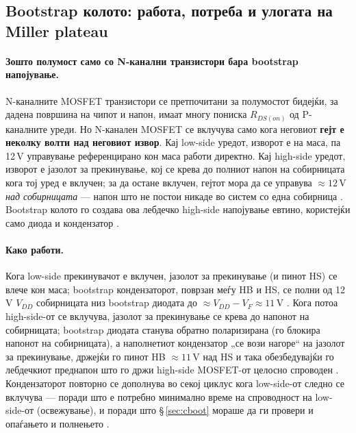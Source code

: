 \documentclass[11pt,a4paper]{article}
\newcommand{\eng}[1]{\textenglish{#1}}
\begin{document}
\subsection{Bootstrap колото: работа, потреба и улогата на Miller plateau}
\label{sec:boottheory}

\paragraph{Зошто полумост само со N-канални транзистори бара bootstrap напојување.} N-каналните MOSFET транзистори се претпочитани за полумостот бидејќи, за дадена површина на чипот и напон, имаат многу пониска $R_{DS(on)}$ од P-каналните уреди. Но N-канален MOSFET се вклучува само кога неговиот \textbf{гејт е неколку волти над неговиот извор}. Кај \eng{low-side} уредот, изворот е на маса, па 12\,V управување референцирано кон маса работи директно. Кај \eng{high-side} уредот, изворот е јазолот за прекинување, кој се крева до полниот напон на собирницата кога тој уред е вклучен; за да остане вклучен, гејтот мора да се управува $\approx 12$\,V \emph{над собирницата} --- напон што не постои никаде во систем со една собирница \cite{ref3,ref5}. \eng{Bootstrap} колото го создава ова лебдечко \eng{high-side} напојување евтино, користејќи само диода и кондензатор \cite{ref6}.

\paragraph{Како работи.} Кога \eng{low-side} прекинувачот е вклучен, јазолот за прекинување (и пинот HS) се влече кон маса; \eng{bootstrap} кондензаторот, поврзан меѓу HB и HS, се полни од 12\,V $V_{DD}$ собирницата низ \eng{bootstrap} диодата до $\approx V_{DD}-V_F \approx 11$\,V \cite{ref3,ref6}. Кога потоа \eng{high-side}-от се вклучува, јазолот за прекинување се крева до напонот на собирницата; \eng{bootstrap} диодата станува обратно поларизирана (го блокира напонот на собирницата), а наполнетиот кондензатор „се вози нагоре“ на јазолот за прекинување, држејќи го пинот HB $\approx 11$\,V над HS и така обезбедувајќи го лебдечкиот преднапон што го држи \eng{high-side} MOSFET-от целосно спроводен \cite{ref3,ref6}. Кондензаторот повторно се дополнува во секој циклус кога \eng{low-side}-от следно се вклучува --- поради што е потребно минимално време на спроводност на \eng{low-side}-от (освежување), и поради што \S\,\ref{sec:cboot} мораше да ги провери и опаѓањето и полнењето \cite{ref6,ref8}.
\end{document}
